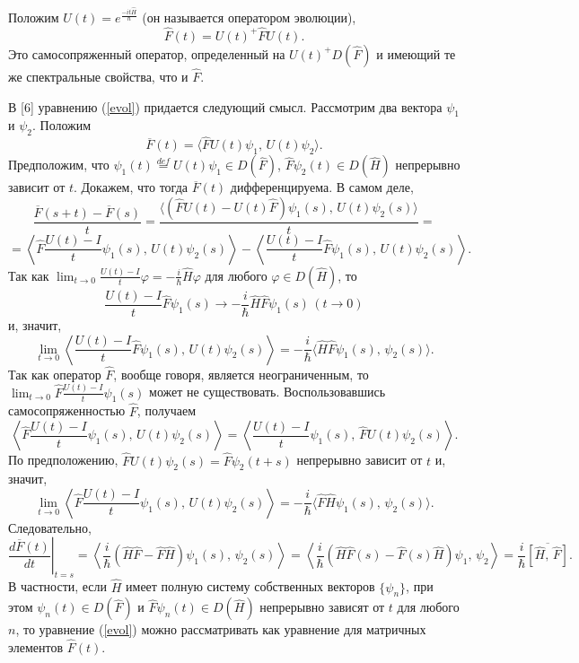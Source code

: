 \documentclass[a4paper
]{article}
\begin{document}
Положим $U(t)=e^{\frac{-it\hat{H}}{\hbar}}$ (он называется оператором
эволюции), $$\hat F(t)=U(t)^+\hat FU(t).$$ Это самосопряженный оператор,
определенный на $U(t)^+D(\hat F)$ и имеющий те же спектральные свойства,
что и $\hat F$. \par
В [6] уравнению (\ref{evol}) придается следующий смысл.
Рассмотрим два вектора $\psi_1$ и $\psi_2$. Положим
$$\overline{F}(t)=\langle \hat{F}U(t)\psi_1, \, U(t)\psi_2\rangle.$$
Предположим, что $\psi_1(t)\stackrel{def}{=} U(t)\psi_1\in D(\hat{F})$,
$\hat{F}\psi_2(t)\in D(\hat{H})$ непрерывно зависит от $t$. Докажем, что
тогда $\overline{F}(t)$ дифференцируема. В самом деле,
$$\frac{\overline{F}(s+t)-\overline{F}(s)}{t}=\frac{\langle (\hat{F}
U(t)-U(t)\hat{F})\psi_1(s), \, U(t)\psi_2(s)\rangle}{t}=$$
$$=\left\langle\hat{F}\frac{U(t)-I}{t}\psi_1(s), \, U(t)\psi_2(s)\right\rangle
-\left\langle\frac{U(t)-I}{t}\hat{F}\psi_1(s), \, U(t)\psi_2(s)\right\rangle.$$
Так как $\lim _{t\rightarrow 0}\frac{U(t)-I}{t}\varphi=-\frac{i}{\hbar}
\hat{H}\varphi$ для любого $\varphi\in D(\hat{H})$, то
$$\frac{U(t)-I}{t}\hat{F}\psi_1(s)\rightarrow -\frac{i}{\hbar}\hat{H}
\hat{F}\psi_1(s)\, (t\rightarrow 0)$$ и, значит,
$$\lim\limits_{t\rightarrow 0}\left\langle\frac{U(t)-I}{t}\hat{F}
\psi_1(s), \, U(t)\psi_2(s)\right\rangle=-\frac{i}{\hbar}\langle
\hat{H}\hat{F}\psi_1(s), \, \psi_2(s)\rangle.$$
Так как оператор $\hat{F}$, вообще говоря, является неограниченным, то
$\lim_{t\rightarrow 0}\hat{F}\frac{U(t)-I}{t}\psi_1(s)$ может не
существовать. Воспользовавшись самосопряженностью $\hat{F}$, получаем
$$\left\langle\hat{F}\frac{U(t)-I}{t}\psi_1(s), \, U(t)\psi_2(s)\right\rangle=
\left\langle\frac{U(t)-I}{t}\psi_1(s), \, \hat{F}U(t)\psi_2(s)\right\rangle.$$
По предположению, $\hat{F}U(t)\psi_2(s)=\hat{F}\psi_2(t+s)$ непрерывно
зависит от $t$ и, значит,
$$\lim \limits_{t\rightarrow 0}\left\langle\hat{F}\frac{U(t)-I}{t}\psi_1(s),
\, U(t)\psi_2(s)\right\rangle=-\frac{i}{\hbar}\langle\hat{F}\hat{H}\psi_1(s),
\, \psi_2(s)\rangle.$$ Следовательно, $$\left.\frac{d\overline{F}(t)}{dt}\right|
_{t=s}=\left\langle\frac{i}{\hbar}(\hat{H}\hat{F}-\hat{F}\hat{H})\psi_1(s), \,
\psi_2(s)\right\rangle=\left\langle\frac{i}{\hbar}(\hat{H}\hat{F}(s)-
\hat{F}(s)\hat{H})\psi_1, \, \psi_2\right\rangle=\frac{i}{\hbar}\overline
{[\hat{H}, \, \hat{F}]}.$$
В частности, если $\hat H$ имеет полную систему собственных векторов
$\{\psi_n\}$, при этом $\psi_n(t)\in D(\hat F)$ и $\hat F\psi_n(t)\in
D(\hat H)$ непрерывно зависят от $t$ для любого $n$, то уравнение
(\ref{evol}) можно рассматривать как уравнение для матричных элементов
$\hat F(t)$. \par
\end{document}
